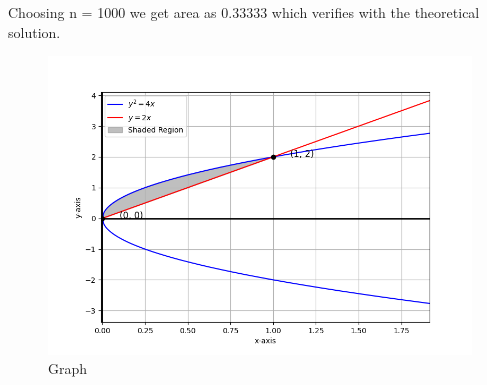 \documentclass[journal]{IEEEtran}
\begin{document}
\begin{enumerate}
	 Choosing n = 1000 we get area as 0.33333 which verifies with the theoretical solution.

	 \begin{figure}[h]  %
    \centering  %
    \includegraphics[width=\columnwidth]{fig/Figure_1.png}  
    \caption{Graph}
    \label{fig:example}  %
\end{figure}
  
\end{enumerate}
\end{document}
